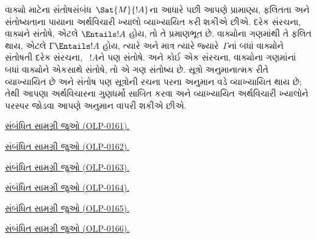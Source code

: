 વાક્યો માટેના સંતોષસંબંધ~$\Sat{M}{!A}$ના આધારે પછી આપણે
પ્રામાણ્ય, ફલિતતા અને સંતોષ્યતાના પાયાના અર્થવિચારી ખ્યાલો
વ્યાખ્યાયિત કરી શકીએ છીએ. દરેક સંરચના, વાક્યને સંતોષે,
એટલે $\Entails !A$ હોય, તો તે પ્રમાણભૂત છે. વાક્યોના ગણમાંથી
તે ફલિત થાય, એટલે $\Gamma \Entails !A$ હોય, ત્યારે અને માત્ર ત્યારે
જ્યારે~$\Gamma$નાં બધાં વાક્યોને સંતોષતી દરેક સંરચના,
~$!A$ને પણ સંતોષે. અને કોઈ એક સંરચના, વાક્યોના ગણમાંનાં
બધાં વાક્યોને એકસાથે સંતોષે, તો એ ગણ સંતોષ્ય છે. સૂત્રો
અનુમાનાત્મક રીતે વ્યાખ્યાયિત છે અને સંતોષ પણ સૂત્રોની રચના પરના
અનુમાન વડે વ્યાખ્યાયિત થાય છે; તેથી આપણા અર્થવિચારના ગુણધર્મો સાબિત
કરવા અને વ્યાખ્યાયિત અર્થવિચારી ખ્યાલોને પરસ્પર જોડવા આપણે અનુમાન
વાપરી શકીએ છીએ.
\endgroup


\begingroup
\makeatletter{}\makeatother
\noindent\hyperref[guunit:OLP-0161]{સંબંધિત સામગ્રી જુઓ (OLP-0161).}\par
\endgroup


\begingroup
\makeatletter{}\makeatother
\noindent\hyperref[guunit:OLP-0162]{સંબંધિત સામગ્રી જુઓ (OLP-0162).}\par
\endgroup


\begingroup
\makeatletter{}\makeatother
\noindent\hyperref[guunit:OLP-0163]{સંબંધિત સામગ્રી જુઓ (OLP-0163).}\par
\endgroup


\begingroup
\makeatletter{}\makeatother
\noindent\hyperref[guunit:OLP-0164]{સંબંધિત સામગ્રી જુઓ (OLP-0164).}\par
\endgroup


\begingroup
\makeatletter{}\makeatother
\noindent\hyperref[guunit:OLP-0165]{સંબંધિત સામગ્રી જુઓ (OLP-0165).}\par
\endgroup


\begingroup
\makeatletter{}\makeatother
\noindent\hyperref[guunit:OLP-0166]{સંબંધિત સામગ્રી જુઓ (OLP-0166).}\par
\endgroup


\OLEndChapterHook
\endgroup


\begingroup
\makeatletter{}\makeatother

\label{guunit:OLP-0167}


\begingroup
\makeatletter{}\makeatother

\label{guunit:OLP-0168}


